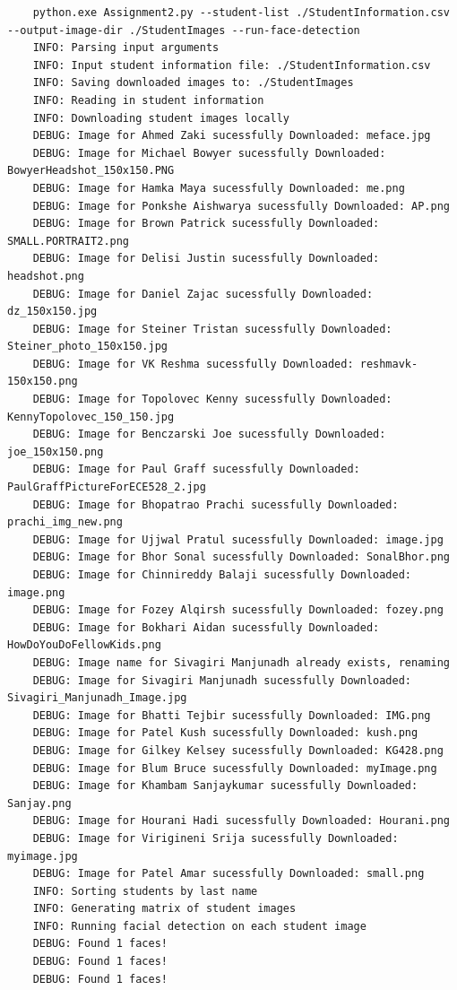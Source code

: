 \documentclass[12pt, letterpaper, final, onecolumn, titlepage] {article}
\begin{document}
\singlespacing
\begin{lstlisting}
	python.exe Assignment2.py --student-list ./StudentInformation.csv --output-image-dir ./StudentImages --run-face-detection
	INFO: Parsing input arguments
	INFO: Input student information file: ./StudentInformation.csv
	INFO: Saving downloaded images to: ./StudentImages
	INFO: Reading in student information
	INFO: Downloading student images locally
	DEBUG: Image for Ahmed Zaki sucessfully Downloaded: meface.jpg
	DEBUG: Image for Michael Bowyer sucessfully Downloaded: BowyerHeadshot_150x150.PNG
	DEBUG: Image for Hamka Maya sucessfully Downloaded: me.png
	DEBUG: Image for Ponkshe Aishwarya sucessfully Downloaded: AP.png
	DEBUG: Image for Brown Patrick sucessfully Downloaded: SMALL.PORTRAIT2.png
	DEBUG: Image for Delisi Justin sucessfully Downloaded: headshot.png
	DEBUG: Image for Daniel Zajac sucessfully Downloaded: dz_150x150.jpg
	DEBUG: Image for Steiner Tristan sucessfully Downloaded: Steiner_photo_150x150.jpg
	DEBUG: Image for VK Reshma sucessfully Downloaded: reshmavk-150x150.png
	DEBUG: Image for Topolovec Kenny sucessfully Downloaded: KennyTopolovec_150_150.jpg
	DEBUG: Image for Benczarski Joe sucessfully Downloaded: joe_150x150.png
	DEBUG: Image for Paul Graff sucessfully Downloaded: PaulGraffPictureForECE528_2.jpg
	DEBUG: Image for Bhopatrao Prachi sucessfully Downloaded: prachi_img_new.png
	DEBUG: Image for Ujjwal Pratul sucessfully Downloaded: image.jpg
	DEBUG: Image for Bhor Sonal sucessfully Downloaded: SonalBhor.png
	DEBUG: Image for Chinnireddy Balaji sucessfully Downloaded: image.png
	DEBUG: Image for Fozey Alqirsh sucessfully Downloaded: fozey.png
	DEBUG: Image for Bokhari Aidan sucessfully Downloaded: HowDoYouDoFellowKids.png
	DEBUG: Image name for Sivagiri Manjunadh already exists, renaming
	DEBUG: Image for Sivagiri Manjunadh sucessfully Downloaded: Sivagiri_Manjunadh_Image.jpg
	DEBUG: Image for Bhatti Tejbir sucessfully Downloaded: IMG.png
	DEBUG: Image for Patel Kush sucessfully Downloaded: kush.png
	DEBUG: Image for Gilkey Kelsey sucessfully Downloaded: KG428.png
	DEBUG: Image for Blum Bruce sucessfully Downloaded: myImage.png
	DEBUG: Image for Khambam Sanjaykumar sucessfully Downloaded: Sanjay.png
	DEBUG: Image for Hourani Hadi sucessfully Downloaded: Hourani.png
	DEBUG: Image for Virigineni Srija sucessfully Downloaded: myimage.jpg
	DEBUG: Image for Patel Amar sucessfully Downloaded: small.png
	INFO: Sorting students by last name
	INFO: Generating matrix of student images
	INFO: Running facial detection on each student image
	DEBUG: Found 1 faces!
	DEBUG: Found 1 faces!
	DEBUG: Found 1 faces!	
\end{lstlisting}
\doublespacing
\end{document}
